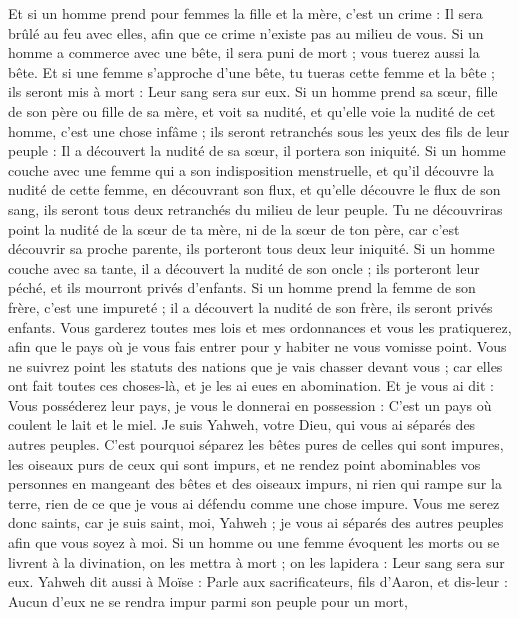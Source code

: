 \begin{multicols}{2}
Et si un homme prend pour femmes la fille et la mère, c'est un crime : Il sera brûlé au feu avec elles, afin que ce crime n’existe pas au milieu de vous.
Si un homme a commerce avec une bête, il sera puni de mort ; vous tuerez aussi la bête.
Et si une femme s’approche d’une bête, tu tueras cette femme et la bête ; ils seront mis à mort : Leur sang sera sur eux.
Si un homme prend sa sœur, fille de son père ou fille de sa mère, et voit sa nudité, et qu'elle voie la nudité de cet homme, c'est une chose infâme ; ils seront retranchés sous les yeux des fils de leur peuple : Il a découvert la nudité de sa sœur, il portera son iniquité.
Si un homme couche avec une femme qui a son indisposition menstruelle, et qu'il découvre la nudité de cette femme, en découvrant son flux, et qu'elle découvre le flux de son sang, ils seront tous deux retranchés du milieu de leur peuple.
Tu ne découvriras point la nudité de la sœur de ta mère, ni de la sœur de ton père, car c’est découvrir sa proche parente, ils porteront tous deux leur iniquité.
Si un homme couche avec sa tante, il a découvert la nudité de son oncle ; ils porteront leur péché, et ils mourront privés d'enfants.
Si un homme prend la femme de son frère, c'est une impureté ; il a découvert la nudité de son frère, ils seront privés enfants.
Vous garderez toutes mes lois et mes ordonnances et vous les pratiquerez, afin que le pays où je vous fais entrer pour y habiter ne vous vomisse point.
Vous ne suivrez point les statuts des nations que je vais chasser devant vous ; car elles ont fait toutes ces choses-là, et je les ai eues en abomination.
Et je vous ai dit : Vous posséderez leur pays, je vous le donnerai en possession : C'est un pays où coulent le lait et le miel. Je suis Yahweh, votre Dieu, qui vous ai séparés des autres peuples.
C'est pourquoi séparez les bêtes pures de celles qui sont impures, les oiseaux purs de ceux qui sont impurs, et ne rendez point abominables vos personnes en mangeant des bêtes et des oiseaux impurs, ni rien qui rampe sur la terre, rien de ce que je vous ai défendu comme une chose impure.
Vous me serez donc saints, car je suis saint, moi, Yahweh ; je vous ai séparés des autres peuples afin que vous soyez à moi.
Si un homme ou une femme évoquent les morts ou se livrent à la divination, on les mettra à mort ; on les lapidera : Leur sang sera sur eux.
\VerseOne{}Yahweh dit aussi à Moïse : Parle aux sacrificateurs, fils d'Aaron, et dis-leur : Aucun d'eux ne se rendra impur parmi son peuple pour un mort,

\end{multicols}
